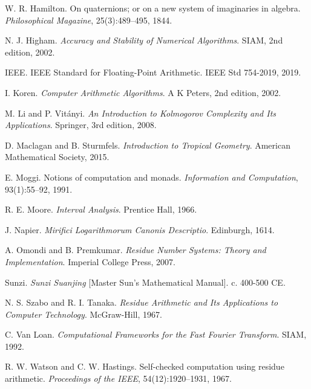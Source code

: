 \documentclass[12pt,a4paper]{article}
\theoremstyle{definition}
\begin{document}
\begin{thebibliography}{99}
W. R. Hamilton.
\newblock On quaternions; or on a new system of imaginaries in algebra.
\newblock \emph{Philosophical Magazine}, 25(3):489--495, 1844.

N. J. Higham.
\newblock \emph{Accuracy and Stability of Numerical Algorithms}.
\newblock SIAM, 2nd edition, 2002.

IEEE.
\newblock IEEE Standard for Floating-Point Arithmetic.
\newblock IEEE Std 754-2019, 2019.

I. Koren.
\newblock \emph{Computer Arithmetic Algorithms}.
\newblock A K Peters, 2nd edition, 2002.

M. Li and P. Vit\'anyi.
\newblock \emph{An Introduction to Kolmogorov Complexity and Its Applications}.
\newblock Springer, 3rd edition, 2008.

D. Maclagan and B. Sturmfels.
\newblock \emph{Introduction to Tropical Geometry}.
\newblock American Mathematical Society, 2015.

E. Moggi.
\newblock Notions of computation and monads.
\newblock \emph{Information and Computation}, 93(1):55--92, 1991.

R. E. Moore.
\newblock \emph{Interval Analysis}.
\newblock Prentice Hall, 1966.

J. Napier.
\newblock \emph{Mirifici Logarithmorum Canonis Descriptio}.
\newblock Edinburgh, 1614.

A. Omondi and B. Premkumar.
\newblock \emph{Residue Number Systems: Theory and Implementation}.
\newblock Imperial College Press, 2007.

Sunzi.
\newblock \emph{Sunzi Suanjing} [Master Sun's Mathematical Manual].
\newblock c. 400-500 CE.

N. S. Szabo and R. I. Tanaka.
\newblock \emph{Residue Arithmetic and Its Applications to Computer Technology}.
\newblock McGraw-Hill, 1967.

C. Van Loan.
\newblock \emph{Computational Frameworks for the Fast Fourier Transform}.
\newblock SIAM, 1992.

R. W. Watson and C. W. Hastings.
\newblock Self-checked computation using residue arithmetic.
\newblock \emph{Proceedings of the IEEE}, 54(12):1920--1931, 1967.


\end{thebibliography}
\end{document}
